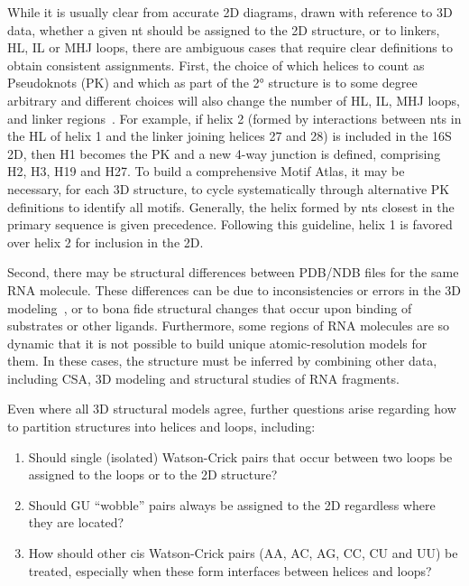While it is usually clear from accurate 2D diagrams, drawn with reference to 3D
data, whether a given nt should be assigned to the 2D structure, or to linkers,
HL, IL or MHJ loops, there are ambiguous cases that require clear definitions to
obtain consistent assignments. First, the choice of which helices to count as
Pseudoknots (PK) and which as part of the 2° structure is to some degree
arbitrary and different choices will also change the number of HL, IL, MHJ
loops, and linker regions~\cite{Smit2008}. For example, if helix 2 (formed by
interactions between nts in the HL of helix 1 and the linker joining helices 27
and 28) is included in the 16S 2D, then H1 becomes the PK and a new 4-way
junction is defined, comprising H2, H3, H19 and H27. To build a comprehensive
Motif Atlas, it may be necessary, for each 3D structure, to cycle systematically
through alternative PK definitions to identify all motifs. Generally, the helix
formed by nts closest in the primary sequence is given precedence. Following
this guideline, helix 1 is favored over helix 2 for inclusion in the 2D\@. 

Second, there may be structural differences between PDB/NDB files for the same
RNA molecule. These differences can be due to inconsistencies or errors in the
3D modeling~\cite{Stombaugh2009}, or to bona fide structural changes that occur
upon binding of substrates or other ligands. Furthermore, some regions of RNA
molecules are so dynamic that it is not possible to build unique
atomic-resolution models for them. In these cases, the structure must be
inferred by combining other data, including CSA, 3D modeling and structural
studies of RNA fragments. 

Even where all 3D structural models agree, further questions arise regarding how
to partition structures into helices and loops, including:

\begin{enumerate}
  \item Should single (isolated) Watson-Crick pairs that occur between two loops
    be assigned to the loops or to the 2D structure? 

  \item Should GU ``wobble'' pairs always be assigned to the 2D regardless where
    they are located? 

  \item How should other cis Watson-Crick pairs (AA, AC, AG, CC, CU and UU) be
    treated, especially when these form interfaces between helices and loops? 
\end{enumerate}

